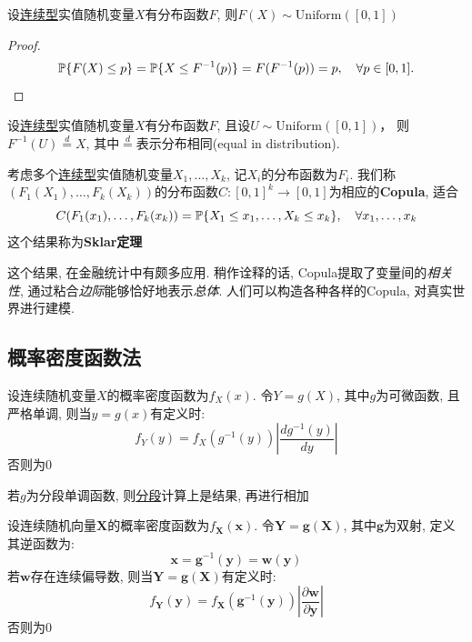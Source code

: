 \begin{theorem}
    设\underline{连续型}实值随机变量$X$有分布函数$F$, 则$F(X) \sim \mathrm{Uniform}([0,1])$
\end{theorem}

\begin{proof}
    \[ \P\{F(X)\le p\} = \P\{X\le F^{-1}(p)\} = F(F^{-1}(p)) =p, \quad \forall p \in [0,1]. \]
\end{proof}

\begin{theorem}\label{thm:pseudo_random_generation}
    设\underline{连续型}实值随机变量$X$有分布函数$F$, 且设$U\sim\mathrm{Uniform}([0,1]) $， 则$ F^{-1}(U) \overset{d}{=} X$, 其中$\overset{d}{=}$表示分布相同(equal in distribution).
\end{theorem}

\begin{theorem}[Sklar定理]
    考虑多个\underline{连续型}实值随机变量$X_{1},\dots,X_{k}$, 记$X_{i}$的分布函数为$F_{i}$. 我们称$(F_{1}(X_{1}),\dots,F_{k}(X_{k}))$的分布函数$C : [0,1]^{k} \to [0,1]$为相应的\textbf{Copula}, 适合
    \[ C(F_{1}(x_{1}),\dots,F_{k}(x_{k})) = \P\{X_{1}\le x_{1},\dots,X_{k}\le x_{k}\}, \quad \forall x_{1},\dots,x_{k} \]
    这个结果称为\textbf{Sklar定理}
\end{theorem}


这个结果, 在金融统计中有颇多应用. 稍作诠释的话, Copula提取了变量间的\emph{相关性}, 通过粘合\emph{边际}能够恰好地表示\emph{总体}.
人们可以构造各种各样的Copula, 对真实世界进行建模.

\subsection{概率密度函数法}

\begin{theorem}
    设连续随机变量$X$的概率密度函数为$f_X(x)$. 令$Y=g(X)$, 其中$g$为可微函数, 且严格单调, 则当$y=g(x)$有定义时:
    \[ f_Y(y)=f_X(g^{-1}(y))\left| \frac{dg^{-1}(y)}{dy} \right|  \]
    否则为$0$

    若$g$为分段单调函数, 则\underline{分段}计算上是结果, 再进行相加
\end{theorem}

\begin{theorem}
    设连续随机向量$\mathbf{X}$的概率密度函数为$f_\mathbf{X}(\mathbf{x})$. 令$\mathbf{Y}=\mathbf{g}(\mathbf{X})$, 其中$\mathbf{g}$为双射, 定义其逆函数为:
    \[ \mathbf{x}=\mathbf{g}^{-1}(\mathbf{y})=\mathbf{w}(\mathbf{y}) \]
    若$\mathbf{w}$存在连续偏导数, 则当$\mathbf{Y}=\mathbf{g}(\mathbf{X})$有定义时:
    \[ f_\mathbf{Y}(\mathbf{y})=f_\mathbf{X}(\mathbf{g}^{-1}(\mathbf{y}))\left| \frac{\partial \mathbf{w}}{\partial \mathbf{y}} \right|  \]
    否则为$0$
\end{theorem}

